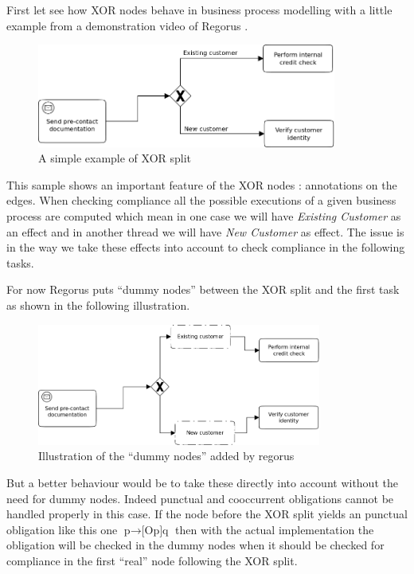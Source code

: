 \documentclass[10pt]{report}
\begin{document}
First let see how XOR nodes behave in business process modelling with a little example from a demonstration video of Regorus \autocite{regorusVid}.

\begin{figure}[!h] %
\begin{center}
\includegraphics[height=3.4cm]{XOR.png} %
\caption{A simple example of XOR split} %
\end{center}
\end{figure} %

This sample shows an important feature of the XOR nodes : annotations on the edges. When checking compliance all the possible executions of a given business process are computed which mean in one case we will have \textit{Existing Customer} as an effect and in another thread we will have \textit{New Customer} as effect. The issue is in the way we take these effects into account to check compliance in the following tasks.

For now Regorus puts \enquote{dummy nodes} between the XOR split and the first task as shown in the following illustration.
\begin{figure}[!h] %
\begin{center}
\includegraphics[height=4cm]{XOR2.png} %
\caption{Illustration of the \enquote{dummy nodes} added by regorus} %
\end{center}
\end{figure} %

But a better behaviour would be to take these directly into account without the need for dummy nodes. Indeed punctual and cooccurrent obligations cannot be handled properly in this case. If the node before the XOR split yields an punctual obligation like this one $\text{p} \rightarrow \text{[Op]q}$ then with the actual implementation the obligation will be checked in the dummy nodes when it should be checked for compliance in the first \enquote{real} node following the XOR split.
\end{document}
